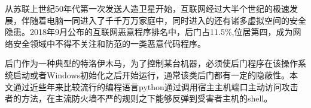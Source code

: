 从苏联上世纪50年代第一次发送人造卫星开始，互联网经过大半个世纪的极速发展，伴随着电脑一同进入了千千万万家庭中，同时进入的还有诸多虚拟空间的安全隐患。2018年9月公布的互联网恶意程序排名中，后门占11.5\%\cite{1},位居第四，成为网络安全领域中不得不关注和防范的一类恶意代码程序。



后门作为一种典型的特洛伊木马，为了控制某台机器，必须使后门程序在该操作系统启动或者Windows初始化之后开始运行，通常该类后门都有一定的隐蔽性。本文通过近些年来比较流行的编程语言python通过调用宿主主机端口主动访问攻击者的方法，在主流防火墙不严的规则之下能够反弹到受害者主机的shell。






	
	
	

